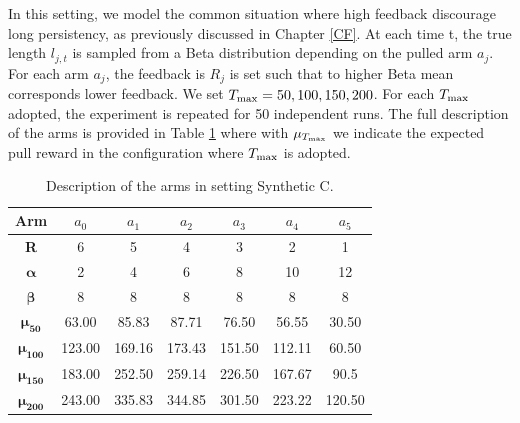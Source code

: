 In this setting, we model the common situation where high feedback discourage long persistency, as previously discussed in Chapter \ref{CF}. At each time t, the true length $l_{j,t}$ is sampled from a Beta distribution depending on the pulled arm $a_j$. For each arm $a_j$, the feedback is $R_j$ is set such that to higher Beta mean corresponds lower feedback. We set $T_{\textnormal{max}}=50,100,150,200$. For each $T_{\textnormal{max}}$ adopted, the experiment is repeated for 50 independent runs. The full description of the arms is provided in Table \ref{tabSC} where with $\mu_{T_{\textnormal{max}}}$ we indicate the expected pull reward in the configuration where $T_{\textnormal{max}}$ is adopted.



\begin{table}[H]
	\centering
	\caption{Description of the arms in setting Synthetic C.}
	
	\begin{tabular}{|c|cccccc|}
		\hline
		\textbf{Arm}          & $a_0$ & $a_1$ & $a_2$ & $a_3$ & $a_4$ & $a_5$ \\ \hline
		\textbf{R}            & 6     & 5     & 4     & 3     & 2     & 1     \\
		$\boldsymbol{\alpha}$ & 2     & 4     & 6     & 8     & 10    & 12    \\
		$\boldsymbol{\beta}$  & 8     & 8     & 8     & 8     & 8     & 8     \\
		$\boldsymbol{\mu_{50}}$    & 63.00 & 85.83 & 87.71 & 76.50 & 56.55 & 30.50  \\ 
		$\boldsymbol{\mu_{100}}$    & 123.00 & 169.16 & 173.43 & 151.50 & 112.11 & 60.50  \\ 
		$\boldsymbol{\mu_{150}}$    & 183.00 & 252.50 & 259.14 & 226.50 & 167.67 & 90.5  \\ 
		$\boldsymbol{\mu_{200}}$    & 243.00 & 335.83 & 344.85 & 301.50 & 223.22 & 120.50  \\ \hline
	\end{tabular}
	
	\label{tabSC}
\end{table}

%



